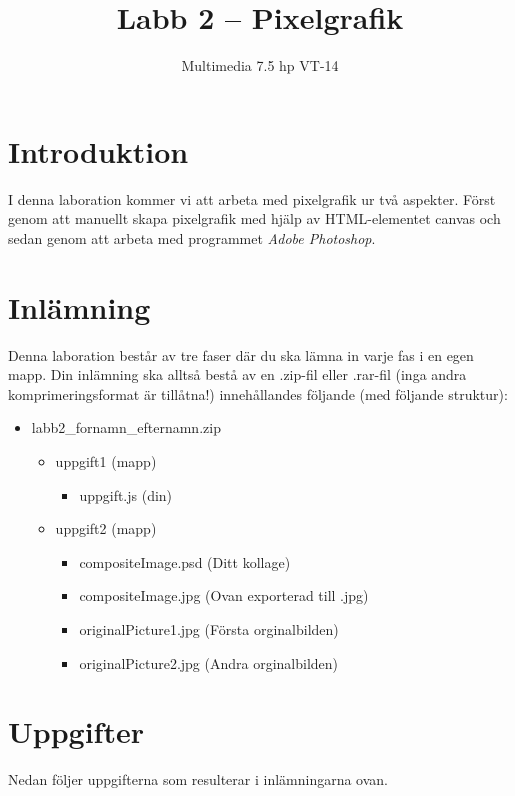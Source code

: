 \documentclass[12pt]{article}
\date{}
\title{ Labb 2 -- Pixelgrafik }
\author{ Multimedia 7.5 hp VT-14 }
\begin{document}
\maketitle
\vspace{-2em}



\section{Introduktion}
I denna laboration kommer vi att arbeta med pixelgrafik ur två aspekter. Först genom att manuellt skapa pixelgrafik med hjälp av HTML-elementet canvas och sedan genom att arbeta med programmet \emph{Adobe Photoshop}.

\section{Inlämning}
Denna laboration består av tre faser där du ska lämna in varje fas i en egen mapp. Din inlämning ska alltså bestå av en .zip-fil eller .rar-fil (inga andra komprimeringsformat är tillåtna!) innehållandes följande (med följande struktur):
  \begin{itemize}
    \item labb2\_fornamn\_efternamn.zip

      \begin{itemize}
        \item uppgift1 (mapp)
          \begin{itemize}
            \item uppgift.js (din)
          \end{itemize}

        \item uppgift2 (mapp)
          \begin{itemize}
	    \item compositeImage.psd (Ditt kollage)
            \item compositeImage.jpg (Ovan exporterad till .jpg)
            \item originalPicture1.jpg (Första orginalbilden)
            \item originalPicture2.jpg (Andra orginalbilden)
          \end{itemize}
    \end{itemize}
  \end{itemize}


\pagebreak
\section{Uppgifter}
Nedan följer uppgifterna som resulterar i inlämningarna ovan.
\end{document}
